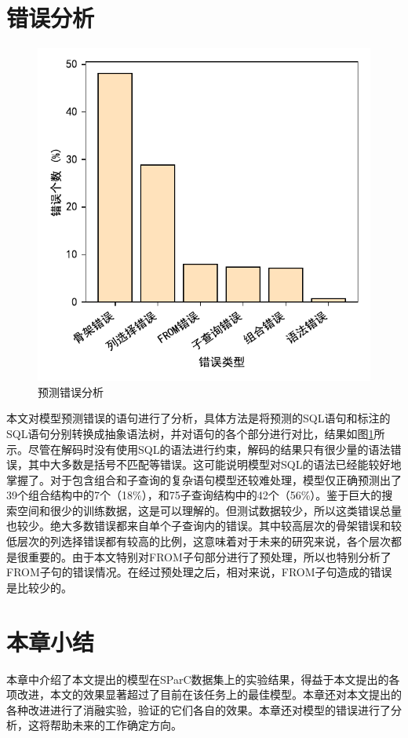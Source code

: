 \section{错误分析}

\begin{figure}[]
    \centering
    \includegraphics{figure/error.pdf}
    \caption{预测错误分析}
    \label{error}
\end{figure}

本文对模型预测错误的语句进行了分析，具体方法是将预测的SQL语句和标注的SQL语句分别转换成抽象语法树，并对语句的各个部分进行对比，结果如图\ref{error}所示。尽管在解码时没有使用SQL的语法进行约束，解码的结果只有很少量的语法错误，其中大多数是括号不匹配等错误。这可能说明模型对SQL的语法已经能较好地掌握了。对于包含组合和子查询的复杂语句模型还较难处理，模型仅正确预测出了39个组合结构中的7个（18\%），和75子查询结构中的42个（56\%）。鉴于巨大的搜索空间和很少的训练数据，这是可以理解的。但测试数据较少，所以这类错误总量也较少。绝大多数错误都来自单个子查询内的错误。其中较高层次的骨架错误和较低层次的列选择错误都有较高的比例，这意味着对于未来的研究来说，各个层次都是很重要的。由于本文特别对FROM子句部分进行了预处理，所以也特别分析了FROM子句的错误情况。在经过预处理之后，相对来说，FROM子句造成的错误是比较少的。

\section{本章小结}

本章中介绍了本文提出的模型在SParC数据集上的实验结果，得益于本文提出的各项改进，本文的效果显著超过了目前在该任务上的最佳模型。本章还对本文提出的各种改进进行了消融实验，验证的它们各自的效果。本章还对模型的错误进行了分析，这将帮助未来的工作确定方向。
